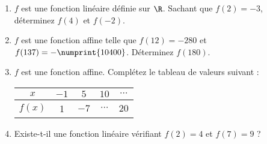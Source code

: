 %
%
%
\begin{exr}
  \begin{enumerate}
  \item $f$ est une fonction linéaire définie sur $\R$. Sachant que $f(2)=-3$, déterminez $f(4)$ et $f(-2)$.
  \item 
$f$ est une fonction affine telle que $f(12)=-280$ et $f(137)=-\numprint{10400}$. Déterminez $f(180)$.%
  \item $f$ est une fonction affine. Complétez le tableau de valeurs suivant : 
    \renewcommand{\arraystretch}{1}
    \begin{tabular}{|c|c|c|c|c|}\hline
    $x$ & $-1$ & $5$ & $10$ & $\cdots$ \\ \hline
    $f(x)$ &1 &$ -7$&$\cdots$ & $20$ \\ \hline
    \end{tabular} 
  \item Existe-t-il une fonction linéaire vérifiant $f(2) = 4$ et $f(7) = 9$ ?
  \end{enumerate}
\end{exr}